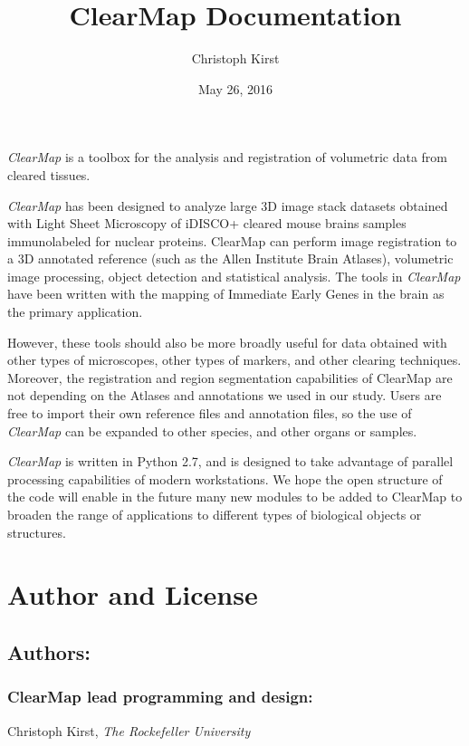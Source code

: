 \documentclass[letterpaper,10pt,english]{sphinxmanual}
\title{ClearMap Documentation}
\date{May 26, 2016}
\author{Christoph Kirst}
\begin{document}
\maketitle
\tableofcontents
{}\label{index::doc}


\emph{ClearMap} is a toolbox for the analysis and registration of volumetric data
from cleared tissues.

\emph{ClearMap} has been designed to analyze large 3D image stack datasets obtained with Light Sheet Microscopy
of iDISCO+ cleared mouse brains samples immunolabeled for nuclear proteins. ClearMap can perform image registration to a 3D annotated reference (such as the Allen Institute Brain Atlases), volumetric image processing, object detection and statistical analysis. The tools in \emph{ClearMap} have been written with the mapping of Immediate Early Genes in the brain as the primary application.

However, these tools should also be more broadly useful for data obtained with other types of microscopes, other types of markers, and other clearing techniques. Moreover, the registration and region segmentation capabilities of ClearMap are not depending on the Atlases and annotations we used in our study. Users are free to import their own reference files and annotation files, so the use of \emph{ClearMap} can be expanded to other species, and other organs or samples.

\emph{ClearMap} is written in Python 2.7, and is designed to take advantage of parallel processing capabilities of modern workstations. We hope the open structure of the code will enable in the future many new modules to be added to ClearMap to broaden the range of applications to different types of biological objects or structures.


\chapter{Author and License}
\label{index:clearmap}\label{index:author-and-license}

\section{Authors:}
\label{index:authors}

\subsection{ClearMap lead programming and design:}
\label{index:clearmap-lead-programming-and-design}
Christoph Kirst,
\emph{The Rockefeller University}
\end{document}
